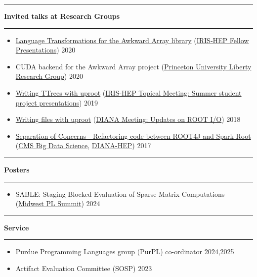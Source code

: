 \documentclass[10pt, letterpaper]{article}
\newcommand{\Section}[1]{
    \Line \par
    \vspace{1pt}
    \textbf{\fontsize{13}{13}\selectfont #1} \par
    \vspace{-7pt}
    \Line \par
    \vspace{3pt}
}
\newcommand{\Line}{
\noindent\rule{\textwidth}{0.4pt}}
\newenvironment{tightitemize}
{
    \vspace{-\topsep}
    \begin{itemize}
        \itemsep2pt \parskip0pt \parsep0pt
}
{
    \end{itemize}
    \vspace{-\topsep}
}
\begin{document}
\Section{Invited talks at Research Groups}
\small{\begin{tightitemize}
\item \href{https://indico.cern.ch/event/946427/contributions/3976986/attachments/2094014/3519161/IRIS-HEP-Fellow-Awkward.pdf}{Language Transformations for the Awkward Array library} (\href{https://indico.cern.ch/event/946427/}{IRIS-HEP Fellow Presentations}) \hfill{2020}
\item CUDA backend for the Awkward Array project (\href{https://liberty.princeton.edu/}{Princeton University Liberty Research Group}) \hfill{2020}
\item \href{https://indico.cern.ch/event/840667/contributions/3527109/attachments/1908764/3153297/uproot-irisfellow-final.pdf}{Writing TTrees with uproot} (\href{https://indico.cern.ch/event/840667/}{IRIS-HEP Topical Meeting: Summer student project presentations}) \hfill{2019}
\item \href{https://indico.cern.ch/event/754335/contributions/3166239/attachments/1734208/2804184/Writing_files_with_uproot_-_DIANA_HEP.pdf}{Writing files with uproot} (\href{https://indico.cern.ch/event/754335/}{DIANA Meeting: Updates on ROOT I/O}) \hfill{2018}
\item \href{https://indico.cern.ch/event/658754/contributions/2685907/attachments/1506368/2347492/Refactoring_code_from_spark-root_to_root4j.pdf}{Separation of Concerns - Refactoring code between ROOT4J and Spark-Root} (\href{https://indico.cern.ch/event/658754/}{CMS Big Data Science}, \href{https://indico.cern.ch/event/655833/}{DIANA-HEP}) \hfill{2017}
\end{tightitemize}}

\Section{Posters}
\begin{tightitemize}
\item SABLE: Staging Blocked Evaluation of Sparse Matrix Computations (\href{https://pl.cs.uchicago.edu/PLSummit/2024/}{Midwest PL Summit}) \hfill{2024}
\end{tightitemize}

\Section{Service}
\begin{tightitemize}
\item Purdue Programming Languages group (PurPL) co-ordinator \hfill 2024,2025
\item Artifact Evaluation Committee (SOSP) \hfill 2023
\end{tightitemize}
\end{document}
